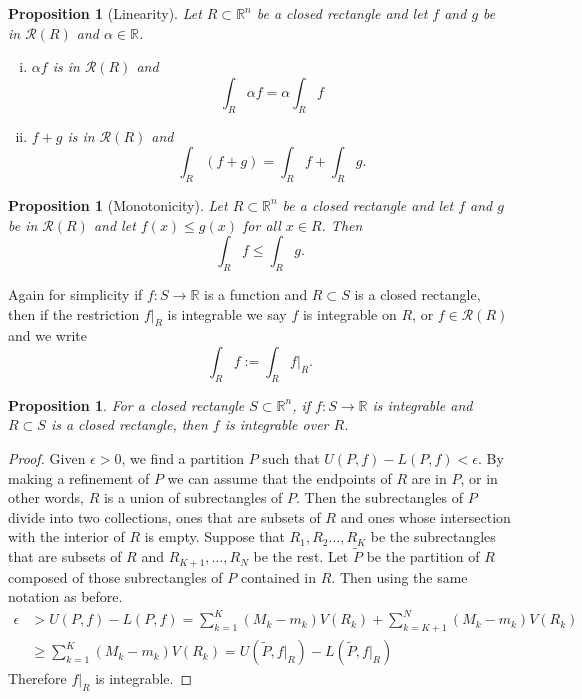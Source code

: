 \documentclass[12pt]{book}
\newcommand{\R}{{\mathbb{R}}}
\newcommand{\sR}{{\mathcal{R}}}
\theoremstyle{plain}
\newtheorem{prop}[thm]{Proposition}
\theoremstyle{remark}
\theoremstyle{definition}
\theoremstyle{exercise}
\theoremstyle{example}
\begin{document}
\begin{prop}[Linearity]
Let $R \subset \R^n$ be a closed rectangle and let
$f$ and $g$ be in $\sR(R)$ and $\alpha \in \R$.
\begin{enumerate}[(i)]
\item $\alpha f$ is in $\sR(R)$ and
\begin{equation*}
\int_R \alpha f = \alpha \int_R f
\end{equation*}
\item $f+g$ is in $\sR(R)$ and
\begin{equation*}
\int_R (f+g) = 
\int_R f
+
\int_R g .
\end{equation*}
\end{enumerate}
\end{prop}

\begin{prop}[Monotonicity]
Let $R \subset \R^n$ be a closed rectangle and let
$f$ and $g$ be in $\sR(R)$ and let $f(x) \leq g(x)$
for all $x \in R$.  Then
\begin{equation*}
\int_R f 
\leq
\int_R g .
\end{equation*}
\end{prop}

Again for simplicity if $f \colon S \to \R$ is a function and $R \subset S$
is a closed rectangle, then if the restriction $f|_R$ is integrable we
say $f$ is integrable on $R$, or $f \in \sR(R)$ and we
write
\begin{equation*}
\int_R f := \int_R f|_R .
\end{equation*}

\begin{prop}
For a closed rectangle $S \subset \R^n$,
if $f \colon S \to \R$ is integrable and $R \subset S$
is a closed rectangle, then $f$ is integrable over $R$.
\end{prop}

\begin{proof}
Given $\epsilon > 0$, we find a partition $P$ such that
$U(P,f)-L(P,f) < \epsilon$.  By making a refinement of $P$
we can assume that the endpoints of $R$ are in $P$, or in other words,
$R$ is a union of subrectangles of $P$.  Then the subrectangles of $P$
divide into two collections, ones that are subsets of $R$
and ones whose intersection with the interior of $R$ is empty.
Suppose that $R_1,R_2\ldots,R_K$ be the subrectangles that
are subsets of $R$ and $R_{K+1},\ldots, R_N$ be the rest.
Let $\tilde{P}$ be the partition of $R$ composed of 
those subrectangles of $P$ contained in $R$.
Then using the same notation as before.
\begin{equation*}
\begin{split}
\epsilon & > 
U(P,f)-L(P,f)
=
\sum_{k=1}^K (M_k-m_k) V(R_k)
+
\sum_{k=K+1}^N (M_k-m_k) V(R_k)
\\
&
\geq
\sum_{k=1}^K (M_k-m_k) V(R_k)
=
U(\tilde{P},f|_R)-L(\tilde{P},f|_R)
\end{split}
\end{equation*}
Therefore $f|_R$ is integrable.
\end{proof}
\end{document}
